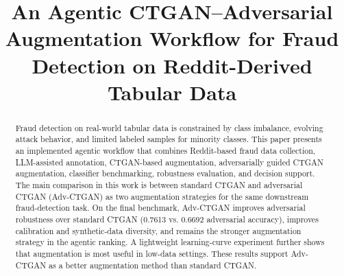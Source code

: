 \documentclass[conference]{IEEEtran}
\begin{document}
\title{An Agentic CTGAN--Adversarial Augmentation Workflow for Fraud Detection on Reddit-Derived Tabular Data}

\author{
\and
{}
\and
{}
\and
{}
\and
{}
}

\maketitle

\begin{abstract}
Fraud detection on real-world tabular data is constrained by class imbalance, evolving attack behavior, and limited labeled samples for minority classes. This paper presents an implemented agentic workflow that combines Reddit-based fraud data collection, LLM-assisted annotation, CTGAN-based augmentation, adversarially guided CTGAN augmentation, classifier benchmarking, robustness evaluation, and decision support. The main comparison in this work is between standard CTGAN and adversarial CTGAN (Adv-CTGAN) as two augmentation strategies for the same downstream fraud-detection task. On the final benchmark, Adv-CTGAN improves adversarial robustness over standard CTGAN (0.7613 vs. 0.6692 adversarial accuracy), improves calibration and synthetic-data diversity, and remains the stronger augmentation strategy in the agentic ranking. A lightweight learning-curve experiment further shows that augmentation is most useful in low-data settings. These results support Adv-CTGAN as a better augmentation method than standard CTGAN.
\end{abstract}
\end{document}
